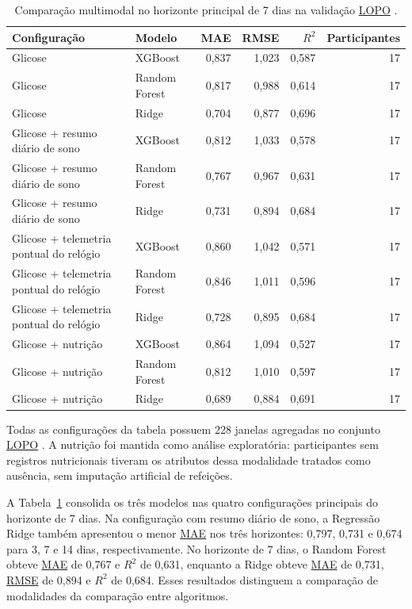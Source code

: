 \documentclass[12pt,a4paper]{article}
\DeclareRobustCommand{\sigla}[1]{%
    \texorpdfstring{\hyperlink{sigla:#1}{#1}}{#1}%
}
\begin{document}
\begin{table}[H]
    \centering
    \caption{Comparação multimodal no horizonte principal de 7 dias na validação \sigla{LOPO}.}
    \label{tab:multimodal-7d}
    \small
    \begin{tabular}{p{4.5cm}lrrrr}
        \toprule
        Configuração & Modelo & MAE & RMSE & $R^2$ & Participantes \\
        \midrule
        Glicose & XGBoost & 0,837 & 1,023 & 0,587 & 17 \\
        Glicose & Random Forest & 0,817 & 0,988 & 0,614 & 17 \\
        Glicose & Ridge & 0,704 & 0,877 & 0,696 & 17 \\
        Glicose + resumo diário de sono & XGBoost & 0,812 & 1,033 & 0,578 & 17 \\
        Glicose + resumo diário de sono & Random Forest & 0,767 & 0,967 & 0,631 & 17 \\
        Glicose + resumo diário de sono & Ridge & 0,731 & 0,894 & 0,684 & 17 \\
        Glicose + telemetria pontual do relógio & XGBoost & 0,860 & 1,042 & 0,571 & 17 \\
        Glicose + telemetria pontual do relógio & Random Forest & 0,846 & 1,011 & 0,596 & 17 \\
        Glicose + telemetria pontual do relógio & Ridge & 0,728 & 0,895 & 0,684 & 17 \\
        Glicose + nutrição & XGBoost & 0,864 & 1,094 & 0,527 & 17 \\
        Glicose + nutrição & Random Forest & 0,812 & 1,010 & 0,597 & 17 \\
        Glicose + nutrição & Ridge & 0,689 & 0,884 & 0,691 & 17 \\
        \bottomrule
    \end{tabular}
\end{table}

Todas as configurações da tabela possuem 228 janelas agregadas no conjunto
\sigla{LOPO}. A nutrição foi mantida como análise exploratória: participantes
sem registros nutricionais tiveram os atributos dessa modalidade tratados como
ausência, sem imputação artificial de refeições.

A Tabela~\ref{tab:multimodal-7d} consolida os três modelos nas quatro
configurações principais do horizonte de 7 dias. Na configuração com resumo diário de sono, a Regressão Ridge também apresentou
o menor \sigla{MAE} nos três horizontes: 0,797, 0,731 e 0,674 para 3, 7 e
14 dias, respectivamente. No horizonte de 7 dias, o Random Forest obteve
\sigla{MAE} de 0,767 e $R^2$ de 0,631, enquanto a Ridge obteve \sigla{MAE} de
0,731, \sigla{RMSE} de 0,894 e $R^2$ de 0,684. Esses resultados distinguem a
comparação de modalidades da comparação entre algoritmos.
\end{document}
